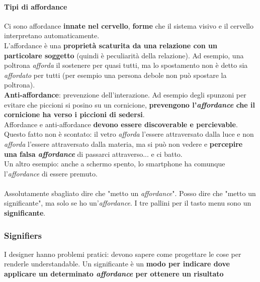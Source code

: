 \documentclass[10pt]{article}
\begin{document}
\paragraph{Tipi di affordance} Ci sono affordance \textbf{innate nel cervello}, \textbf{forme} che il sistema visivo e il cervello interpretano automaticamente.\\
L'affordance è una \textbf{proprietà scaturita da una relazione con un particolare soggetto} (quindi è peculiarità della relazione). Ad esempio, una poltrona \textit{afforda} il sostenere per quasi tutti, ma lo spostamento non è detto sia \textit{affordato} per tutti (per esempio una persona debole non può spostare la poltrona).\\
\textbf{Anti-affordance}: prevenzione dell'interazione. Ad esempio degli spunzoni per evitare che piccioni si posino su un cornicione, \textbf{prevengono l'\textit{affordance} che il cornicione ha verso i piccioni di sedersi}.\\
Affordance e anti-affordance \textbf{devono essere discoverable e percievable}. Questo fatto non è scontato: il vetro \textit{afforda} l'essere attraversato dalla luce e non \textit{afforda} l'essere attraversato dalla materia, ma si può non vedere e \textbf{percepire una falsa \textit{affordance}} di passarci attraverso... e ci batto.\\
Un altro esempio: anche a schermo spento, lo smartphone ha comunque l'\textit{affordance} di essere premuto.\\\\
Assolutamente sbagliato dire che "metto un \textit{affordance}". Posso dire che "metto un significante", ma solo se ho un'\textit{affordance}. I tre pallini per il tasto menu sono un \textbf{significante}.
\subsubsection{Signifiers}
I designer hanno problemi pratici: devono sapere come progettare le cose per renderle understandable. Un significante è un \textbf{modo per indicare dove applicare un determinato \textit{affordance} per ottenere un risultato}
\end{document}
